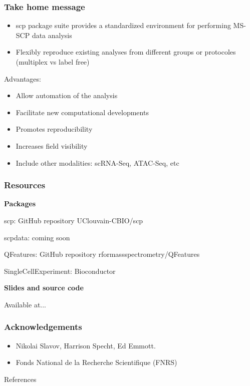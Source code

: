 \documentclass{beamer}
\newcommand{\hcode}[2][lgray]{{\ttfamily\color{vdgray}\colorbox{#1}{#2}}}
\newcommand{\frametitlesection}[1]{\frametitle{\centering #1 \footnotesize \hspace{0pt plus 1 filll} \insertsection}}
\begin{document}
\begin{frame}
    \frametitlesection{Take home message}

    \begin{itemize}
        \item{\hcode{scp} package suite provides a standardized environment for
        performing MS-SCP data analysis}
        \item{Flexibly reproduce existing analyses from different groups or
        protocoles (multiplex vs label free)}
    \end{itemize}

    \bigskip

    Advantages:

    \begin{itemize}
        \item{Allow automation of the analysis}
        \item{Facilitate new computational developments}
        \item{Promotes reproducibility}
        \item{Increases field visibility}
        \item{Include other modalities: scRNA-Seq, ATAC-Seq, etc}
    \end{itemize}

\end{frame}

\begin{frame}
    \frametitlesection{Resources}

    \textbf{Packages}

    \begin{itemize}
        \item{\hcode{scp}: GitHub repository \hcode{UClouvain-CBIO/scp}}
        \item{\hcode{scpdata}: coming soon
        \item{\hcode{QFeatures}: GitHub repository \hcode{rformassspectrometry/QFeatures}}
        \item{\hcode{SingleCellExperiment}: Bioconductor}}
    \end{itemize}

    \bigskip


    \bigskip

    \textbf{Slides and source code}

    Available at...

\end{frame}

\begin{frame}
    \frametitlesection{Acknowledgements}

    \begin{itemize}
    \item Nikolai Slavov, Harrison Specht, Ed Emmott.
    \item Fonds National de la Recherche Scientifique (FNRS)
    \end{itemize}

\end{frame}




\begin{frame}[allowframebreaks]{References}
  \scriptsize
  
  
\end{frame}
\end{document}
